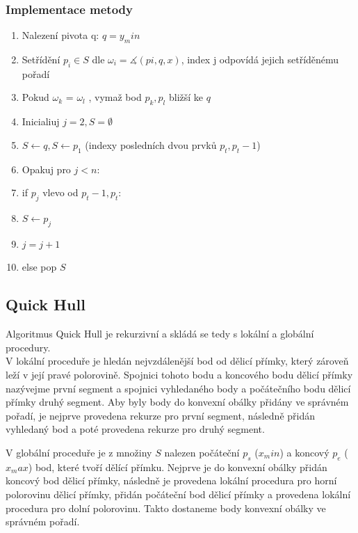 \documentclass[a4paper, 12pt]{article}
\begin{document}
\subsubsection{Implementace metody}
\begin{enumerate}
	\item Nalezení pivota q:  $ q = y_min $ 
	\item Setřídění $ p_i \in S$  dle $\omega_i = \measuredangle (pi, q, x)$, index j odpovídá jejich setříděnému pořadí
	\item Pokud $\omega_k$ = $\omega_l$ , vymaž bod $p_k,p_l$ bližší ke $q$
	\item Inicialiuj $j = 2, S = \emptyset$
	\item $S \longleftarrow q, S \longleftarrow p_1$ (indexy posledních dvou prvků $p_t, p_t-1$) 
	\item Opakuj pro $j < n:$
	\item \hspace {1cm} if $p_j$ vlevo od $p_t-1, p_t:$
	\item \hspace {1.5cm} $S \longleftarrow p_j $
	\item  \hspace {1.5cm} $j = j + 1$
	\item \hspace {1cm} else pop $S$	
\end{enumerate}
\clearpage

\subsection{Quick Hull}
Algoritmus Quick Hull je rekurzivní a skládá se tedy s lokální a globální procedury.\\
V lokální proceduře je hledán nejvzdálenější bod od dělicí přímky, který zároveň leží v její pravé polorovině. Spojnici tohoto bodu a koncového bodu dělicí přímky nazývejme první segment a spojnici vyhledaného body a počátečního bodu dělicí přímky druhý segment. Aby byly body do konvexní obálky přidány ve správném pořadí, je nejprve provedena rekurze pro první segment, následně přidán vyhledaný bod a poté provedena rekurze pro druhý segment.

V globální proceduře je z množiny $S$ nalezen počáteční $p_s$ ($x_min$) a koncový $p_e$ ($x_max$) bod, které tvoří dělící přímku. Nejprve je do konvexní obálky přidán koncový bod dělicí přímky, následně je provedena lokální procedura pro horní polorovinu dělicí přímky, přidán počáteční bod dělicí přímky a  provedena lokální procedura pro dolní polorovinu. Takto dostaneme body konvexní obálky ve správném pořadí.
\end{document}
